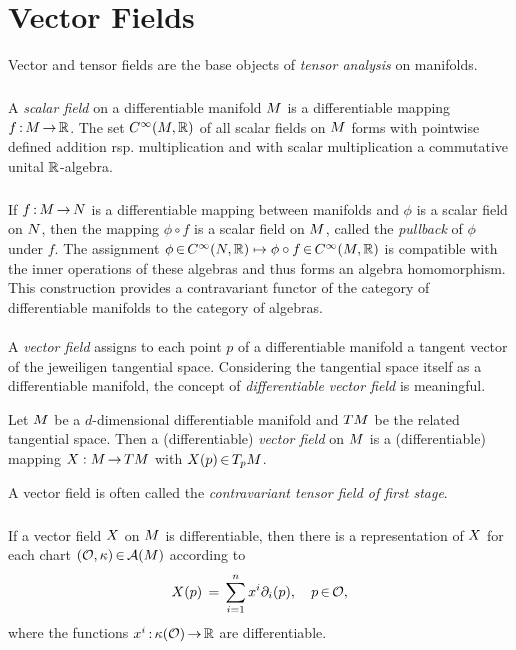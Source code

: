 \documentclass[11pt,twoside]{article}
\begin{document}
\section{Vector Fields}
Vector and tensor fields are the base objects of \textit{tensor analysis}
on manifolds.

\subparagraph{}
A \textit{scalar field} on a differentiable manifold ${M}$ is
a differentiable mapping $f{\,:\,}{M} {\,\to\,} {\mathbb{R}}$.
The set $C^{\infty}({M},{\mathbb{R}})$ of all scalar fields on ${M}$ forms
with pointwise defined addition rsp. multiplication and
with scalar multiplication a commutative unital ${\mathbb{R}}$-algebra.

\subparagraph{}
If $f{\,:\,}{M} {\,\to\,} {N}$ is a differentiable mapping
between manifolds and $\phi$ is a scalar field on ${N}$,
then the mapping $\phi \circ f$ is a scalar field on ${M}$,
called the \textit{pullback} of $\phi$ under $f$.
The assignment
$\phi {\,\in\,} C^{\infty}({N},{\mathbb{R}}) \mapsto
 \phi \circ f {\,\in\,} C^{\infty}({M},{\mathbb{R}})$
is compatible with the inner operations of these algebras
and thus forms an algebra homomorphism.
This construction provides a contravariant functor of the
category of differentiable manifolds to the category of algebras.

\paragraph{}
A \textit{vector field} assigns to each point $p$ of a differentiable
manifold a tangent vector of the jeweiligen tangential space.
Considering the tangential space itself as a differentiable manifold,
the concept of \textit{differentiable vector field} is meaningful.

\begin{definition}
Let ${M}$ be a $d$-dimensional differentiable manifold
and $T {M}$ be the related tangential space.
Then a (differentiable) \textit{vector field} on ${M}$
is a (differentiable) mapping $X:{M} {\,\to\,} T {M}$
with $X(p) {\,\in\,} T_p {M}$.
\end{definition}

A vector field is often called
the \textit{contravariant tensor field of first stage}.

\subparagraph{}
If a vector field $X$ on ${M}$ is differentiable,
then there is a representation of $X$
for each chart $(\mathcal{O},\kappa) {\,\in\,} {\mathcal{A}}({M})$ according to
\[
X(p) \,=\, \sum_{i=1}^n x^i \partial_i(p), \quad p {\,\in\,} \mathcal{O},
\]
where the functions $x^i {\,:\,} \kappa(\mathcal{O}) {\,\to\,} {\mathbb{R}}$ are differentiable.
\end{document}
